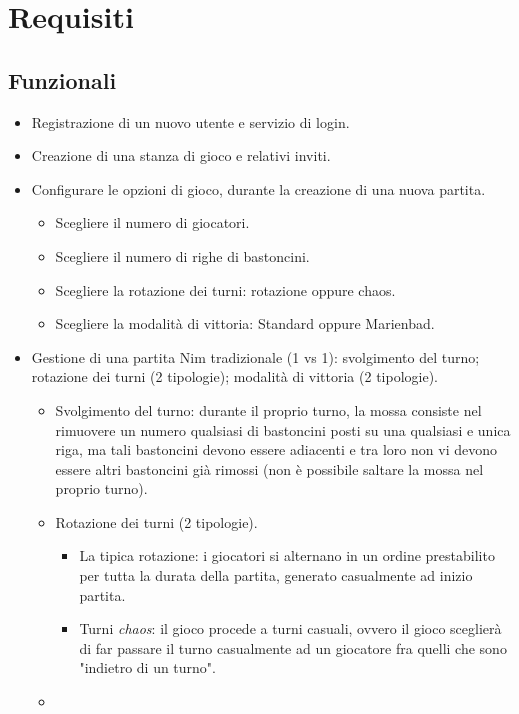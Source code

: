 \section{Requisiti}

\subsection{Funzionali}
\label{requisiti funzionali}

\begin{itemize}
\item
	Registrazione di un nuovo utente e servizio di login.
\item
	Creazione di una stanza di gioco e relativi inviti.
\item
	Configurare le opzioni di gioco, durante la creazione di una nuova partita.
	\begin{itemize}
	\item
		Scegliere il numero di giocatori.
	\item
		Scegliere il numero di righe di bastoncini.
	\item
		Scegliere la rotazione dei turni: rotazione oppure chaos.
	\item
		Scegliere la modalità di vittoria: Standard oppure Marienbad.
	\end{itemize}
\item
	Gestione di una partita Nim tradizionale (1 vs 1): svolgimento del turno; rotazione dei turni (2 tipologie); modalità di vittoria (2 tipologie).
	\begin{itemize}
	\item
		Svolgimento del turno: durante il proprio turno, la mossa consiste nel rimuovere un numero qualsiasi di bastoncini posti su una qualsiasi e unica riga, ma tali bastoncini devono essere adiacenti e tra loro non vi devono essere altri bastoncini già rimossi (non è possibile saltare la mossa nel proprio turno).
	\item
		Rotazione dei turni (2 tipologie).
		\begin{itemize}
		\item
			La tipica rotazione: i giocatori si alternano in un ordine prestabilito per tutta la durata della partita, generato casualmente ad inizio partita.
		\item
			Turni \emph{chaos}: il gioco procede a turni casuali, ovvero il gioco sceglierà di far passare il turno casualmente ad un giocatore fra quelli che sono "indietro di un turno".
		\end{itemize}
	\item

\end{itemize}
\end{itemize}
